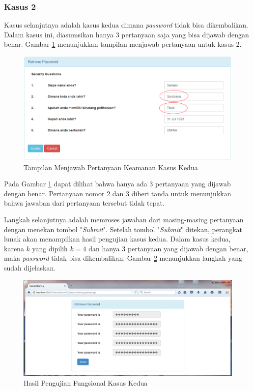 \subsubsection{Kasus 2}

Kasus selanjutnya adalah kasus kedua dimana \textit{password} tidak bisa dikembalikan. Dalam kasus ini, diasumsikan hanya 3 pertanyaan saja yang bisa dijawab dengan benar. Gambar \ref{fig:fungsional4} menunjukkan tampilan menjawab pertanyaan untuk kasus 2.

\begin{figure}[H]
	\includegraphics[scale=0.6]{Gambar/fungsional4}
	\centering
	\caption{Tampilan Menjawab Pertanyaan Keamanan Kasus Kedua}\label{fig:fungsional4}
\end{figure}

Pada Gambar \ref{fig:fungsional4} dapat dilihat bahwa hanya ada 3 pertanyaan yang dijawab dengan benar. Pertanyaan nomor 2 dan 3 diberi tanda untuk menunjukkan bahwa jawaban dari pertanyaan tersebut tidak tepat.

Langkah selanjutnya adalah memroses jawaban dari masing-masing pertanyaan dengan menekan tombol "\textit{Submit}". Setelah tombol "\textit{Submit}" ditekan, perangkat lunak akan menampilkan hasil pengujian kasus kedua. Dalam kasus kedua, karena $k$ yang dipilih $k=4$ dan hanya 3 pertanyaan yang dijawab dengan benar, maka \textit{password} tidak bisa dikembalikan. Gambar \ref{fig:fungsional5} menunjukkan langkah yang sudah dijelaskan.

\begin{figure}[H]
	\includegraphics[scale=0.5]{Gambar/fungsional5}
	\centering
	\caption{Hasil Pengujian Fungsional Kasus Kedua}\label{fig:fungsional5}
\end{figure}

